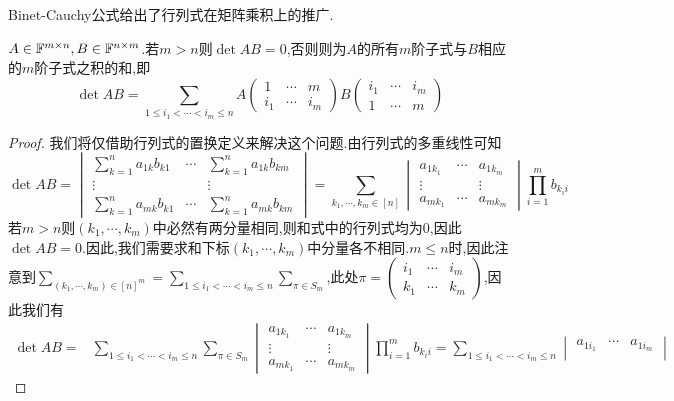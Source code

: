 \documentclass[openany]{book}
\begin{document}
Binet-Cauchy公式给出了行列式在矩阵乘积上的推广.
\begin{theorem}
    $A\in \F^{m\times n},B\in \F^{n\times m}$.若$m>n$则$\det AB=0$,否则则为$A$的所有$m$阶子式与$B$相应的$m$阶子式之积的和,即
    $$\det AB=\sum_{1\leq i_1<\cdots<i_m\leq n}A\begin{pmatrix}
        1&\cdots&m\\i_1&\cdots&i_m
    \end{pmatrix}B\begin{pmatrix}
        i_1&\cdots&i_m\\1&\cdots&m
    \end{pmatrix}$$
\end{theorem}
\begin{proof}
    我们将仅借助行列式的置换定义来解决这个问题.由行列式的多重线性可知
    $$\det AB=\begin{vmatrix}
        \sum_{k=1}^{n}a_{1k}b_{k1}&\cdots&\sum_{k=1}^{n}a_{1k}b_{km}\\
        \vdots&&\vdots\\
        \sum_{k=1}^{n}a_{mk}b_{k1}&\cdots&\sum_{k=1}^{n}a_{mk}b_{km}
    \end{vmatrix}=\sum_{k_1,\cdots,k_m\in [n]}\begin{vmatrix}
        a_{1k_1}&\cdots&a_{1k_m}\\
        \vdots&&\vdots\\
        a_{mk_1}&\cdots&a_{mk_m}
    \end{vmatrix}\prod_{i=1}^{m}b_{k_ii}$$
    若$m>n$则$(k_1,\cdots,k_m)$中必然有两分量相同,则和式中的行列式均为0,因此$\det AB=0$.因此,我们需要求和下标$(k_1,\cdots,k_m)$中分量各不相同.$m\leq n$时,因此注意到$\sum_{(k_1,\cdots,k_m)\in [n]^m}=\sum_{1\leq i_1<\cdots<i_m\leq n}\sum_{\pi\in S_m}$,此处$\pi=\begin{pmatrix}
        i_1&\cdots&i_m\\k_1&\cdots&k_m
    \end{pmatrix}$,因此我们有
    $$\begin{aligned}
        \det AB=&\sum_{1\leq i_1<\cdots<i_m\leq n}\sum_{\pi\in S_m}\begin{vmatrix}
        a_{1k_1}&\cdots&a_{1k_m}\\
        \vdots&&\vdots\\
        a_{mk_1}&\cdots&a_{mk_m}
    \end{vmatrix}\prod_{i=1}^{m}b_{k_ii}=\sum_{1\leq i_1<\cdots<i_m\leq n}\begin{vmatrix}
        a_{1i_1}&\cdots&a_{1i_m}\\

\end{vmatrix}
\end{aligned}$$
\end{proof}
\end{document}
